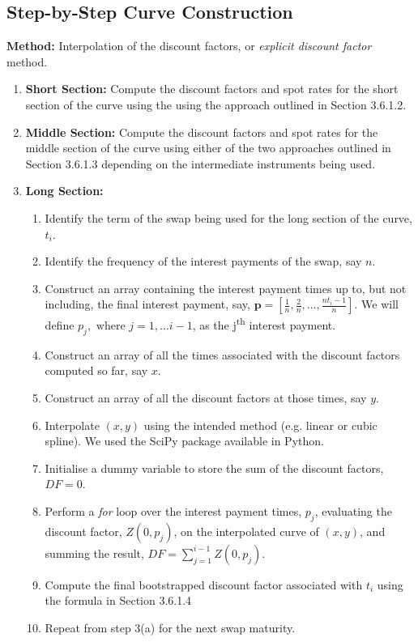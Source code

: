 \subsection{Step-by-Step Curve Construction}
\textbf{Method:} Interpolation of the discount factors, or \textit{explicit discount factor} method.
\begin{enumerate}
    \item \textbf{Short Section:} Compute the discount factors and spot rates for the short section of the curve using the using the approach outlined in Section 3.6.1.2. 
    \item \textbf{Middle Section:} Compute the discount factors and spot rates for the middle section of the curve using either of the two approaches outlined in Section 3.6.1.3 depending on the intermediate instruments being used.
    \item \textbf{Long Section:}
    \begin{enumerate}
        \item Identify the term of the swap being used for the long section of the curve, $t_i$.
        \item Identify the frequency of the interest payments of the swap, say $n$.
        \item Construct an array containing the interest payment times up to, but not including, the final interest payment, say, $\textbf{p} = \left[ \frac{1}{n}, \frac{2}{n}, \ldots, \frac{n t_i - 1}{n} \right]$. We will define $p_j, \text{ where } j = 1, \ldots i-1$, as the j\textsuperscript{th} interest payment.
        \item Construct an array of all the times associated with the discount factors computed so far, say $x$.
        \item Construct an array of all the discount factors at those times, say $y$.
        \item Interpolate $(x,y)$ using the intended method (e.g. linear or cubic spline). We used the SciPy package available in Python. 
        \item Initialise a dummy variable to store the sum of the discount factors, $DF = 0$.
        \item Perform a \textit{for} loop over the interest payment times, $p_j$, evaluating the discount factor, $Z(0,p_j)$, on the interpolated curve of $(x,y)$, and summing the result, $DF = \sum_{j=1}^{i-1} Z(0,p_j)$.
        \item Compute the final bootstrapped discount factor associated with $t_i$ using the formula in Section 3.6.1.4
        \item Repeat from step 3(a) for the next swap maturity.
    \end{enumerate}
\end{enumerate}

